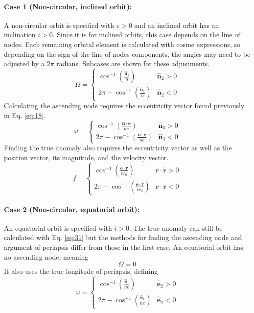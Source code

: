 \paragraph{Case 1 (Non-circular, inclined orbit):}
A non-circular orbit is specified with $e>0$ and an inclined orbit has an inclination $i>0$. Since it is for inclined orbits, this case depends on the line of nodes. Each remaining orbital element is calculated with cosine expressions, so depending on the sign of the line of nodes components, the angles may need to be adjusted by a $2\pi$ radians. Subcases are shown for these adjustments.
\begin{equation} \label{eq:29}
\Omega = 
\begin{cases}
\cos^{-1}(\frac{\bm{\hat{n}}_1}{n}) & \bm{\hat{n}}_2 > 0\\
2\pi - \cos^{-1}(\frac{\bm{\hat{n}}_1}{n}) & \bm{\hat{n}}_2 < 0
\end{cases}
\end{equation}
Calculating the ascending node requires the eccentricity vector found previously in Eq. \ref{eq:18}.
\begin{equation} \label{eq:30}
\omega = 
\begin{cases}
\cos^{-1}(\frac{\bm{n} \cdot \bm{e}}{n e}) & \bm{\hat{n}}_3 > 0\\
2\pi - \cos^{-1}(\frac{\bm{n} \cdot \bm{e}}{n e}) & \bm{\hat{n}}_3 < 0
\end{cases}
\end{equation}
Finding the true anomaly also requires the eccentricity vector as well as the position vector, its magnitude, and the velocity vector. 
\begin{equation} \label{eq:31}
f =
\begin{cases}
\cos^{-1}(\frac{\bm{e} \cdot \bm{r}}{e r_0}) & \bm{r} \cdot \bm{\dot{r}} > 0\\
2\pi - \cos^{-1}(\frac{\bm{e} \cdot \bm{r}}{e r_0}) & \bm{r} \cdot \bm{\dot{r}} < 0
\end{cases}
\end{equation}
\paragraph{Case 2 (Non-circular, equatorial orbit):}
An equatorial orbit is specified with $i>0$. The true anomaly can still be calculated with Eq. \ref{eq:31} but the methods for finding the ascending node and argument of periapsis differ from those in the first case. An equatorial orbit has no ascending node, meaning
\begin{equation}
\Omega = 0
\end{equation}
It also uses the true longitude of periapsis, defining
\begin{equation}
\omega = 
\begin{cases}
\cos^{-1}(\frac{\bm{\hat{e}}_1}{n e}) & \bm{\hat{e}}_2 > 0 \\
2\pi - \cos^{-1}(\frac{\bm{\hat{e}}_1}{n e}) & \bm{\hat{e}}_2 < 0
\end{cases}
\end{equation}

